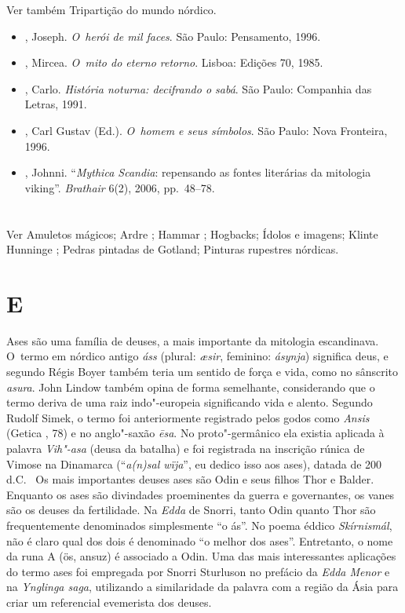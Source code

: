 Ver também Tripartição do mundo nórdico.



\begin{itemize}\footnotesize
\item
  , Joseph. \emph{O~herói de mil faces}. São Paulo: Pensamento,
  1996.
\item
  , Mircea. \emph{O~mito do eterno retorno}. Lisboa: Edições 70,
  1985.
\item
  , Carlo. \emph{História noturna: decifrando o sabá}. São
  Paulo: Companhia das Letras, 1991.
\item
  , Carl Gustav (Ed.). \emph{O~homem e seus símbolos}. São Paulo:
  Nova Fronteira, 1996.
\item
  , Johnni. ``\emph{Mythica Scandia}: repensando as fontes literárias da
  mitologia viking''. \emph{Brathair} 6(2), 2006, pp.~48--78.
\end{itemize}

\section{  }

Ver Amuletos mágicos; Ardre ; Hammar ; Hogbacks; Ídolos e imagens;
Klinte Hunninge ; Pedras pintadas de Gotland; Pinturas rupestres
nórdicas.

\section{ E }

Ases são uma família de deuses, a mais importante da mitologia
escandinava. O~termo em nórdico antigo \emph{áss} (plural: \emph{æsir},
feminino: \emph{ásynja}) significa deus, e segundo Régis Boyer também
teria um sentido de força e vida, como no sânscrito \emph{asura}. John
Lindow também opina de forma semelhante, considerando que o termo deriva
de uma raiz indo"-europeia significando vida e alento. Segundo Rudolf
Simek, o termo foi anteriormente registrado pelos godos como
\emph{Ansis} (Getica , 78) e no anglo"-saxão \emph{ēsa}. No
proto"-germânico ela existia aplicada à palavra \emph{Vih"-asa} (deusa da
batalha) e foi registrada na inscrição rúnica de Vimose na Dinamarca
(``\emph{a(n)sal wïja}'', eu dedico isso aos ases), datada de 200 d.C.~
Os mais importantes deuses ases são Odin e seus filhos Thor e Balder.
Enquanto os ases são divindades proeminentes da guerra e governantes, os
vanes são os deuses da fertilidade. Na \emph{Edda} de Snorri, tanto Odin
quanto Thor são frequentemente denominados simplesmente ``o ás''. No
poema éddico \emph{Skírnismál}, não é claro qual dos dois é denominado
``o melhor dos ases''. Entretanto, o nome da runa A (ös, ansuz) é
associado a Odin. Uma das mais interessantes aplicações do termo ases
foi empregada por Snorri Sturluson no prefácio da \emph{Edda Menor} e na
\emph{Ynglinga saga}, utilizando a similaridade da palavra com a região
da Ásia para criar um referencial evemerista dos deuses.

